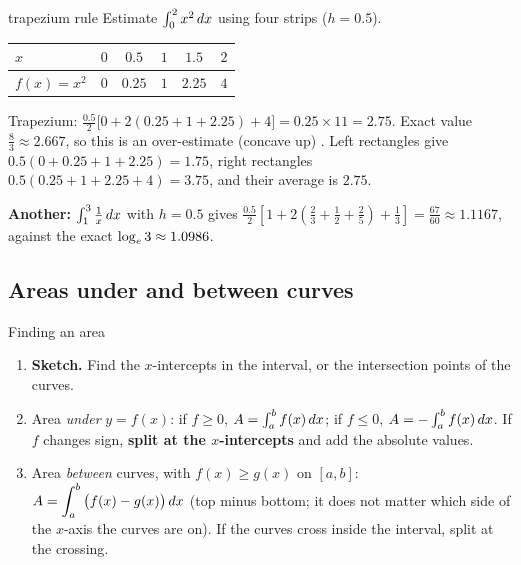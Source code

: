 \begin{example}{trapezium rule \byhand}
Estimate $\int_0^2x^2\,dx$ using four strips ($h=0.5$).\par
\begin{tabular}{@{}l|ccccc@{}}
$x$ & $0$ & $0.5$ & $1$ & $1.5$ & $2$\\ \hline
$f(x)=x^2$ & $0$ & $0.25$ & $1$ & $2.25$ & $4$
\end{tabular}\par
Trapezium: $\frac{0.5}{2}\big[0+2(0.25+1+2.25)+4\big]=0.25\times11=2.75$. Exact value $\frac83\approx2.667$, so this is an over-estimate (concave up) \tick. Left rectangles give $0.5(0+0.25+1+2.25)=1.75$, right rectangles $0.5(0.25+1+2.25+4)=3.75$, and their average is $2.75$.\par
\textbf{Another:} $\int_1^3\frac1x\,dx$ with $h=0.5$ gives $\frac{0.5}{2}\left[1+2\left(\frac23+\frac12+\frac25\right)+\frac13\right]=\frac{67}{60}\approx1.1167$, against the exact $\log_e3\approx1.0986$.
\end{example}

\subsection{Areas under and between curves}
\label{sec:area}

\begin{method}{Finding an area}
\begin{enumerate}
  \item \textbf{Sketch.} Find the $x$-intercepts in the interval, or the intersection points of the curves.
  \item Area \emph{under} $y=f(x)$: if $f\ge0$, $A=\int_a^bf(x)\,dx$; if $f\le0$, $A=-\int_a^bf(x)\,dx$. If $f$ changes sign, \textbf{split at the $x$-intercepts} and add the absolute values.
  \item Area \emph{between} curves, with $f(x)\ge g(x)$ on $[a,b]$: $A=\displaystyle\int_a^b\big(f(x)-g(x)\big)\,dx$ (top minus bottom; it does not matter which side of the $x$-axis the curves are on). If the curves cross inside the interval, split at the crossing.
\end{enumerate}
\end{method}

